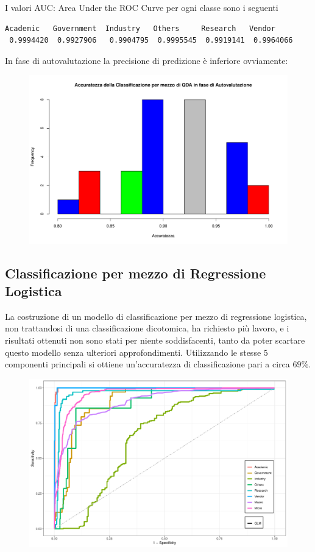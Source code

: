 \documentclass[11pt,a4paper]{article}
\begin{document}
\noindent I valori AUC: Area Under the ROC Curve per ogni classe sono i seguenti
\begin{lstlisting}[language=bash,basicstyle=\scriptsize,tabsize=2,frame = single]
 Academic   Government  Industry   Others     Research   Vendor
 0.9994420  0.9927906   0.9904795  0.9995545  0.9919141  0.9964066
\end{lstlisting}
In fase di autovalutazione la precisione di predizione \`e inferiore ovviamente:
\begin{figure}[H]
	\vspace{-0.4cm}
	\hspace{-0.5cm}
	\includegraphics[scale=.6]{imgs/QDA_hist.pdf}
\end{figure}
\subsection{Classificazione per mezzo di Regressione Logistica}
La costruzione di un modello di classificazione per mezzo di regressione
logistica, non trattandosi di una classificazione dicotomica, ha richiesto pi\`u
lavoro, e i risultati ottenuti non sono stati per niente soddisfacenti, tanto da
poter scartare questo modello senza ulteriori approfondimenti. Utilizzando le
stesse $5$ componenti principali si ottiene un'accuratezza di classificazione
pari a circa $69\%$.
\begin{figure}[H]
	\vspace{-1.5cm}
	\hspace{-0.5cm}
	\includegraphics[scale=.60]{imgs/GLM_ggplot.pdf}
\end{figure}
\end{document}
